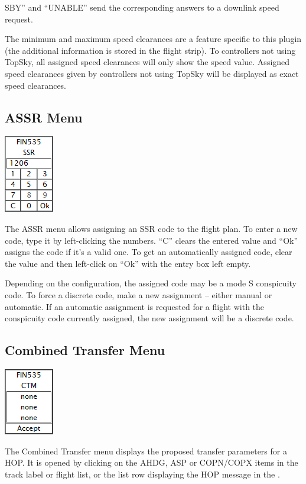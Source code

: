 \documentclass[11pt,a4paper,oldfontcommands]{memoir}
\newenvironment{Warn}
  {\begin{shaded}\marginnote{\fbox{Warning}}}
  {\end{shaded}}
\begin{document}
SBY” and “UNABLE” send the corresponding answers to a downlink speed request.

\begin{Warn}
The minimum and maximum speed clearances are a feature specific to this plugin (the additional information is stored in the flight strip). To controllers not using TopSky, all assigned speed clearances will only show the speed value. Assigned speed clearances given by controllers not using TopSky will be displayed as exact speed clearances.
\end{Warn}

\subsection{ASSR Menu}
\label{menu:assr}
\includegraphics{img/assr.png}

The ASSR menu allows assigning an SSR code to the flight plan. To enter a new code, type it by left-clicking the numbers. “C” clears the entered value and “Ok” assigns the code if it’s a valid one. To get an automatically assigned code, clear the value and then left-click on “Ok” with the entry box left empty.

Depending on the configuration, the assigned code may be a mode S conspicuity code. To force a discrete code, make a new assignment – either manual or automatic. If an automatic assignment is requested for a flight with the conspicuity code currently assigned, the new assignment will be a discrete code.

\subsection{Combined Transfer Menu}
\label{menu:ctm}
\includegraphics{img/ctm.png}

The Combined Transfer menu displays the proposed transfer parameters for a HOP. It is opened by clicking on the AHDG, ASP or COPN/COPX items in the track label or flight list, or the list row displaying the HOP message in the \textit{}.
\end{document}
